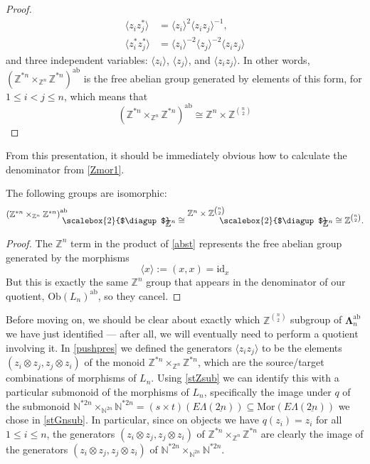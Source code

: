\documentclass{amsbook} %
\newcommand{\id}{\textrm{id}}
\newcommand{\MLn}{\mathbf{\Lambda}_n}
\newcommand{\bigquotient}[2]{ \raisebox{0.75\height}{$#1$} \mkern-12mu\scalebox{2}{$\diagup$}\mkern-10mu \raisebox{-0.5\height}{$#2$} }
\newcommand{\ELnn}{E\Lambda(\underline{2n})}
\newcommand{\ab}{\mathrm{ab}}
\numberwithin{section}{chapter}
\begin{document}
\begin{proof}
\begin{align*}
			\langle z_i z_j^* \rangle &= \langle z_i \rangle^2 \langle z_i z_j \rangle^{-1}, \\
			\langle z_i^* z_j^* \rangle &= \langle z_i \rangle^{-2} \langle z_j \rangle^{-2} \langle z_i z_j \rangle
  \end{align*}
and three independent variables: $\langle z_i \rangle$, $\langle z_j \rangle$, and $\langle z_i z_j \rangle$. In other words, $(\mathbb{Z}^{\ast n} \times_{\mathbb{Z}^n} \mathbb{Z}^{\ast n})^{\ab}$ is the free abelian group generated by elements of this form, for $1 \le i < j \le n$, which means that
  \[
    (\mathbb{Z}^{\ast n} \times_{\mathbb{Z}^n} \mathbb{Z}^{\ast n})^{\ab}  \cong  \mathbb{Z}^n \times \mathbb{Z}^{\binom{n}{2}}
  \]
\end{proof}

From this presentation, it should be immediately obvious how to calculate the denominator from \cref{Zmor1}.

\begin{cor}\label{nchoose2}
The following groups are isomorphic:
  \[
    \bigquotient{{(\mathbb{Z}^{\ast n} \times_{\mathbb{Z}^n} \mathbb{Z}^{\ast n})}^{\ab}}{\mathbb{Z}^n} \cong \bigquotient{\mathbb{Z}^n \times \mathbb{Z}^{\binom{n}{2}}}{\mathbb{Z}^n} \cong \mathbb{Z}^{\binom{n}{2}}.
  \]
\end{cor}
\begin{proof}
The $\mathbb{Z}^n$ term in the product of \cref{abst} represents the free abelian group generated by the morphisms
  \[
    \langle x \rangle  :=  (x,x)  =  \id_{x}
  \]
But this is exactly the same $\mathbb{Z}^n$ group that appears in the denominator of our quotient, $\mathrm{Ob}(L_n)^{\ab}$, so they cancel.
\end{proof}


Before moving on, we should be clear about exactly which $\mathbb{Z}^{\binom{n}{2}}$ subgroup of $\MLn^{\ab}$ we have just identified --- after all, we will eventually need to perform a quotient involving it. In \cref{pushpres} we defined the generators $\langle z_i z_j \rangle$ to be the elements $(z_i \otimes z_j, z_j \otimes z_i)$ of the monoid $\mathbb{Z}^{\ast n} \times_{\mathbb{Z}^n} \mathbb{Z}^{\ast n}$, which are the source/target combinations of morphisms of $L_n$. Using \cref{stZsub} we can identify this with a particular submonoid of the morphisms of $L_n$, specifically the image under $q$ of the submonoid $\mathbb{N}^{\ast 2n} \times_{\mathbb{N}^{2n}} \mathbb{N}^{\ast 2n} = (s \times t)(\ELnn) \subseteq \mathrm{Mor}(\ELnn)$ we chose in \cref{stGnsub}. In particular, since on objects we have $q(z_i) = z_i$ for all $1 \le i \le n$, the generators $(z_i \otimes z_j, z_j \otimes z_i)$ of $\mathbb{Z}^{\ast n} \times_{\mathbb{Z}^n} \mathbb{Z}^{\ast n}$ are clearly the image of the generators $(z_i \otimes z_j, z_j \otimes z_i)$ of $\mathbb{N}^{\ast 2n} \times_{\mathbb{N}^{2n}} \mathbb{N}^{\ast 2n}$. 
\end{document}
